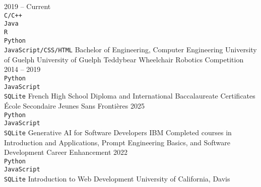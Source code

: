 \documentclass[9pt]{src/developercv} %
\begin{document}
\begin{entrylist}
	\entry
		{2019 -- Current\\
		\footnotesize{\texttt{C/C++}}\hfill\\
		\footnotesize{\texttt{Java}}\hfill\\
		\footnotesize{\texttt{R}}\hfill\\
		\footnotesize{\texttt{Python}}\hfill\\
		\footnotesize{\texttt{JavaScript/CSS/HTML}}\hfill}
		{Bachelor of Engineering, Computer Engineering}
		{University of Guelph}
		{University of Guelph Teddybear Wheelchair Robotics Competition\hfill\\}
	\entry
		{2014 -- 2019\\
		\footnotesize{\texttt{Python}}\hfill\\
		\footnotesize{\texttt{JavaScript}}\hfill\\
		\footnotesize{\texttt{SQLite}}\hfill}
		{French High School Diploma and International Baccalaureate Certificates}
		{École Secondaire Jeunes Sans Frontières}
		{}
	\entry
		{2025\\
		\footnotesize{\texttt{Python}}\hfill\\
		\footnotesize{\texttt{JavaScript}}\hfill\\
		\footnotesize{\texttt{SQLite}}\hfill}
		{Generative AI for Software Developers}
		{IBM}
		{Completed courses in Introduction and Applications, Prompt Engineering Basics, and Software Development Career Enhancement}
	\entry
		{2022\\
		\footnotesize{\texttt{Python}}\hfill\\
		\footnotesize{\texttt{JavaScript}}\hfill\\
		\footnotesize{\texttt{SQLite}}\hfill}
		{Introduction to Web Development}
		{University of California, Davis}
		{}
\end{entrylist}

\end{document}
